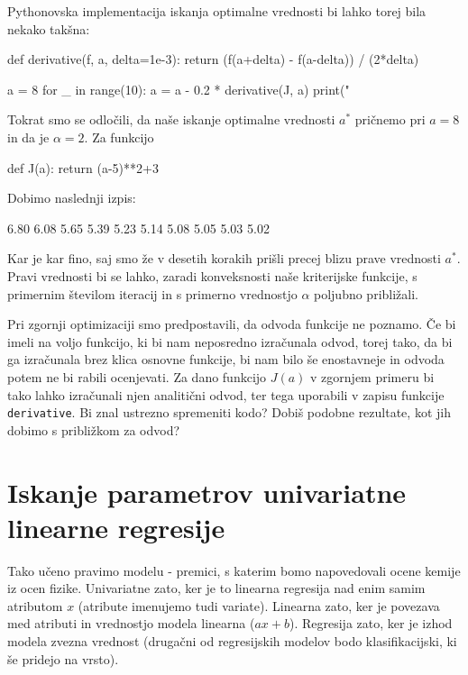 Pythonovska implementacija iskanja optimalne vrednosti bi lahko torej
bila nekako takšna:

\begin{python}
def derivative(f, a, delta=1e-3):
    return (f(a+delta) - f(a-delta)) / (2*delta)

a = 8
for _ in range(10):
    a = a - 0.2 * derivative(J, a)
    print("%
\end{python}

Tokrat smo se odločili, da naše iskanje optimalne vrednosti $a^*$
pričnemo pri $a=8$ in da je $\alpha=2$. Za funkcijo

\begin{python}
def J(a):
    return (a-5)**2+3
\end{python}

Dobimo naslednji izpis:

\begin{python}
6.80
6.08
5.65
5.39
5.23
5.14
5.08
5.05
5.03
5.02
\end{python}

Kar je kar fino, saj smo že v desetih korakih prišli precej blizu
prave vrednosti $a^*$. Pravi vrednosti bi se lahko, zaradi
konveksnosti naše kriterijske funkcije, s primernim številom
iteracij in s primerno vrednostjo $\alpha$ poljubno približali.

Pri zgornji optimizaciji smo predpostavili, da odvoda funkcije ne
poznamo. Če bi imeli na voljo funkcijo, ki bi nam neposredno
izračunala odvod, torej tako, da bi ga izračunala brez klica osnovne
funkcije, bi nam bilo še enostavneje in odvoda potem ne bi rabili
ocenjevati. Za dano funkcijo $J(a)$ v zgornjem primeru bi tako lahko
izračunali njen analitični odvod, ter tega uporabili v zapisu funkcije
{\tt derivative}. Bi znal ustrezno spremeniti kodo? Dobiš podobne
rezultate, kot jih dobimo s približkom za odvod?

\section{Iskanje parametrov univariatne linearne regresije}

Tako učeno pravimo modelu - premici, s katerim bomo napovedovali ocene
kemije iz ocen fizike. Univariatne zato, ker je to linearna regresija
nad enim samim atributom $x$ (atribute imenujemo tudi
variate). Linearna zato, ker je povezava med atributi in vrednostjo
modela linearna ($a x + b$). Regresija zato, ker je izhod modela
zvezna vrednost (drugačni od regresijskih modelov bodo
klasifikacijski, ki še pridejo na vrsto).


